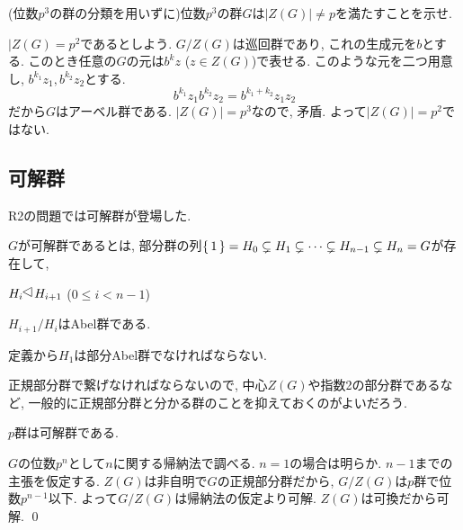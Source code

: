 \begin{egprob}
(位数$p^3$の群の分類を用いずに)位数$p^3$の群$G$は$|Z(G)| \neq p$を満たすことを示せ.
\end{egprob}
\begin{egans}
$|Z(G)=p^2$であるとしよう. $G/Z(G)$は巡回群であり, これの生成元を$b$とする. このとき任意の$G$の元は$b^kz$ ($z\in Z(G)$)で表せる. このような元を二つ用意し, $b^{k_1}z_1, b^{k_2}z_2$とする.
\[b^{k_1}z_1b^{k_2}z_2 = b^{k_1+k_2}z_1z_2\]
だから$G$はアーベル群である. $|Z(G)| = p^3$なので, 矛盾. よって$|Z(G)|=p^2$ではない.
\end{egans}




\subsection{可解群}
R2の問題では可解群が登場した.
\begin{defn}
$G$が可解群であるとは, 部分群の列$\set{1} = H_0 \subsetneq H_1 \subsetneq \dots \subsetneq H_{n-1} \subsetneq H_n = G$が存在して,
\ben
\item $H_i \norgr H_{i+1}$ ($0\leq i < n-1$)
\item $H_{i+1}/H_i$はAbel群である.
\een
\end{defn}

\begin{rem}
定義から$H_1$は部分Abel群でなければならない.
\end{rem}

正規部分群で繋げなければならないので, 中心$Z(G)$や指数2の部分群であるなど, 一般的に正規部分群と分かる群のことを抑えておくのがよいだろう.


\begin{theo}
$p$群は可解群である.
\end{theo}
\prf $G$の位数$p^n$として$n$に関する帰納法で調べる. $n=1$の場合は明らか. $n-1$までの主張を仮定する.  $Z(G)$は非自明で$G$の正規部分群だから, $G/Z(G)$は$p$群で位数$p^{n-1}$以下. よって$G/Z(G)$は帰納法の仮定より可解. $Z(G)$は可換だから可解.
\qed




